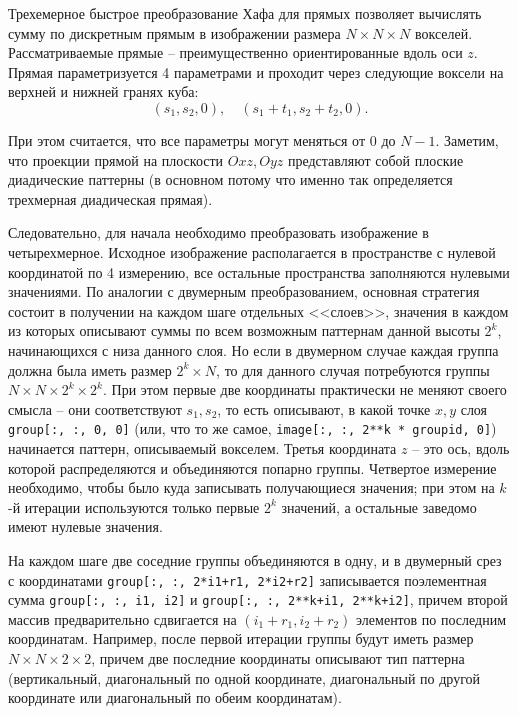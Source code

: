 
Трехемерное быстрое преобразование Хафа для прямых позволяет вычислять сумму по дискретным прямым в изображении размера $N \times N \times N$ вокселей. Рассматриваемые прямые -- преимущественно ориентированные вдоль оси $z$. Прямая параметризуется 4 параметрами и проходит через следующие воксели на верхней и нижней гранях куба:
\begin{equation*}
    (s_1, s_2, 0), \quad
    (s_1 + t_1, s_2 + t_2, 0).
\end{equation*}

При этом считается, что все параметры могут меняться от $0$ до $N-1$. Заметим, что проекции прямой на плоскости $Oxz, Oyz$ представляют собой плоские диадические паттерны (в основном потому что именно так определяется трехмерная диадическая прямая).

Следовательно, для начала необходимо преобразовать изображение в четырехмерное. Исходное изображение располагается в пространстве с нулевой координатой по 4 измерению, все остальные пространства заполняются нулевыми значениями.
По аналогии с двумерным преобразованием, основная стратегия состоит в получении на каждом шаге отдельных <<слоев>>, значения в каждом из которых описывают суммы по всем возможным паттернам данной высоты $2^k$, начинающихся с низа данного слоя.
Но если в двумерном случае каждая группа должна была иметь размер $2^k \times N$, то для данного случая потребуются группы $N \times N \times 2^k \times 2^k$.
При этом первые две координаты практически не меняют своего смысла -- они соответствуют $s_1, s_2$, то есть описывают, в какой точке $x, y$ слоя \texttt{group[:, :, 0, 0]} (или, что то же самое, \texttt{image[:, :, 2**k * groupid, 0]}) начинается паттерн, описываемый вокселем. Третья координата $z$ -- это ось, вдоль которой распределяются и объединяются попарно группы. Четвертое измерение необходимо, чтобы было куда записывать получающиеся значения; при этом на $k$-й итерации используются только первые $2^k$ значений, а остальные заведомо имеют нулевые значения.

На каждом шаге две соседние группы объединяются в одну, и в двумерный срез с координатами \texttt{group[:, :, 2*i1+r1, 2*i2+r2]} записывается поэлементная сумма \texttt{group[:, :, i1, i2]} и \texttt{group[:, :, 2**k+i1, 2**k+i2]}, причем второй массив предварительно сдвигается на $(i_1+r_1, i_2+r_2)$ элементов по последним координатам. Например, после первой итерации группы будут иметь размер $N \times N \times 2 \times 2$, причем две последние координаты описывают тип паттерна (вертикальный, диагональный по одной координате, диагональный по другой координате или диагональный по обеим координатам).

